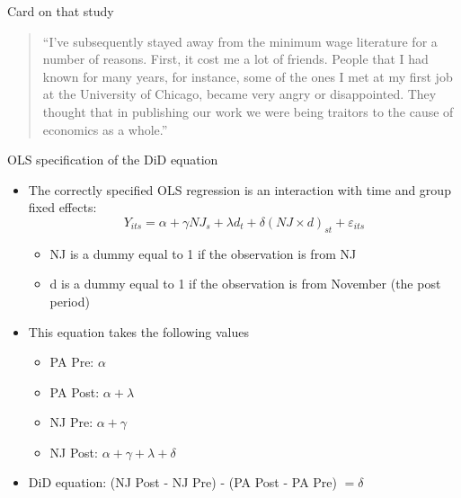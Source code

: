 \documentclass{beamer}
\begin{document}
\begin{frame}{Card on that study}

\begin{quote}
``I’ve subsequently stayed away from the minimum wage literature for a number of reasons. First, it cost me a lot of friends. People that I had known for many years, for instance, some of the ones I met at my first job at the University of Chicago, became very angry or disappointed. They thought that in publishing our work we were being traitors to the cause of economics as a whole.''
\end{quote}


\end{frame}



\begin{frame}{OLS specification of the DiD equation}
	
	\begin{itemize}
	\item The correctly specified OLS regression is an interaction with time and group fixed effects:$$Y_{its} = \alpha + \gamma NJ_s + \lambda d_t + \delta (NJ \times d)_{st} + \varepsilon_{its}$$
		\begin{itemize}
		\item NJ is a dummy equal to 1 if the observation is from NJ
		\item d is a dummy equal to 1 if the observation is from November (the post period)
		\end{itemize}
	\item This equation takes the following values
		\begin{itemize}
		\item PA Pre: $\alpha$
		\item PA Post: $\alpha + \lambda$
		\item NJ Pre: $\alpha + \gamma$
		\item NJ Post: $\alpha + \gamma + \lambda + \delta$
		\end{itemize}
	\item DiD equation: (NJ Post - NJ Pre) - (PA Post - PA Pre) $= \delta$
	\end{itemize}
\end{frame}
\end{document}
